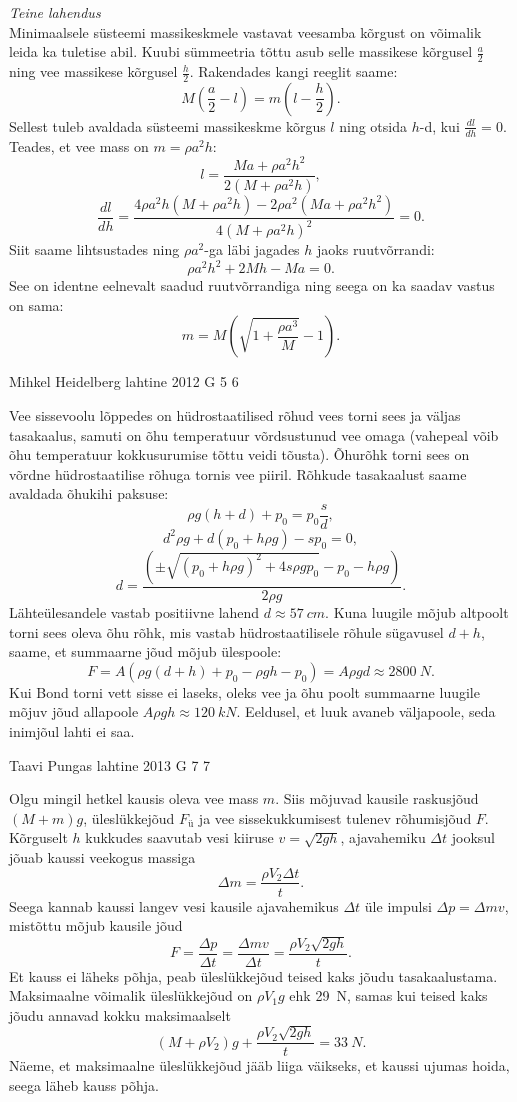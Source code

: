 \documentclass[11pt, twoside]{article}
\begin{document}
{{\emph{Teine lahendus}\\
Minimaalsele süsteemi massikeskmele vastavat veesamba kõrgust on võimalik leida ka tuletise abil. Kuubi sümmeetria tõttu asub selle massikese kõrgusel $\frac{a}{2}$ ning vee massikese kõrgusel $\frac{h}{2}$. Rakendades kangi reeglit saame: 
$$M(\frac{a}{2}-l)=m(l-\frac{h}{2}).$$ 
Sellest tuleb avaldada süsteemi massikeskme kõrgus $l$ ning otsida $h$-d, kui $\frac{dl}{dh}=0$. Teades, et vee mass on $m=\rho a^2h$:
$$l=\frac{Ma+\rho a^2h^2}{2(M+\rho a^2h)},$$ 
$$\frac{dl}{dh}=\frac{4\rho a^2h(M+\rho a^2h)-2\rho a^2(Ma+\rho a^2h^2)}{4(M+\rho a^2h)^2}=0.$$ 
Siit saame lihtsustades ning $\rho a^2$-ga läbi jagades $h$ jaoks ruutvõrrandi:
$$\rho a^2h^2+2Mh-Ma=0.$$ 
See on identne eelnevalt saadud ruutvõrrandiga ning seega on ka saadav vastus on sama:
$$m=M(\sqrt{1+\frac{\rho a^3}{M}}-1).$$
\fi
}

{Mihkel Heidelberg} %
{lahtine} %
{2012} %
{G 5} %
{6} %
{

\ifSolution
Vee sissevoolu lõppedes on hüdrostaatilised rõhud vees torni sees ja väljas tasakaalus, samuti on õhu temperatuur võrdsustunud vee omaga (vahepeal võib õhu temperatuur kokkusurumise tõttu veidi tõusta). Õhurõhk torni sees on võrdne hüdrostaatilise rõhuga tornis vee piiril. Rõhkude tasakaalust saame avaldada õhukihi paksuse:
$$ \rho g (h+d) + p_0 = p_0 \frac{s}{d},$$
$$ d^2 \rho g + d (p_0 + h \rho g) - s p_0=0, $$
$$ d = \frac{( \pm \sqrt{(p_0 + h \rho g)^2 + 4 s \rho g p_0 } - p_0 - h \rho g)}{2\rho g }.$$
Lähteülesandele vastab positiivne lahend $d \approx \SI{57}{cm}$.
Kuna luugile mõjub altpoolt torni sees oleva õhu rõhk, mis vastab hüdrostaatilisele rõhule sügavusel $d+h$, saame, et summaarne jõud mõjub ülespoole:
$$F = A(\rho g (d+h) + p_0 - \rho g h - p_0) = A \rho g d \approx \SI{2800}{N}. $$ 
Kui Bond torni vett sisse ei laseks, oleks vee ja õhu poolt summaarne luugile mõjuv jõud allapoole $A \rho g h \approx \SI{120}{kN}$. Eeldusel, et luuk avaneb väljapoole, seda inimjõul lahti ei saa.
\fi
}

{Taavi Pungas} %
{lahtine} %
{2013} %
{G 7} %
{7} %
{

\ifSolution
Olgu mingil hetkel kausis oleva vee mass $m$. Siis mõjuvad kausile raskusjõud $(M+m)g$, üleslükkejõud $F_{ü}$ ja vee sissekukkumisest tulenev rõhumisjõud $F$. Kõrguselt $h$ kukkudes saavutab vesi kiiruse $v=\sqrt{2gh}$, ajavahemiku $\Delta t$ jooksul jõuab kaussi veekogus massiga
\[
\Delta m = \frac{\rho V_2 \Delta t}{t}.
\]
Seega kannab kaussi langev vesi kausile ajavahemikus $\Delta t$ üle impulsi $\Delta p =\Delta m v$, mistõttu mõjub kausile jõud
\[
F=\frac{\Delta p}{\Delta t}=\frac{\Delta m v}{\Delta t}=\frac{\rho V_2 \sqrt{2gh}}{t}.
\]
Et kauss ei läheks põhja, peab üleslükkejõud teised kaks jõudu tasakaalustama. Maksimaalne võimalik üleslükkejõud on $\rho V_1 g$ ehk \SI{29}{N}, samas kui teised kaks jõudu annavad kokku maksimaalselt
\[
(M+\rho V_2)g + \frac{\rho V_2 \sqrt{2gh}}{t} = \SI{33}{N}.
\]
Näeme, et maksimaalne üleslükkejõud jääb liiga väikseks, et kaussi ujumas hoida, seega läheb kauss põhja.
\fi
}

}
\end{document}
